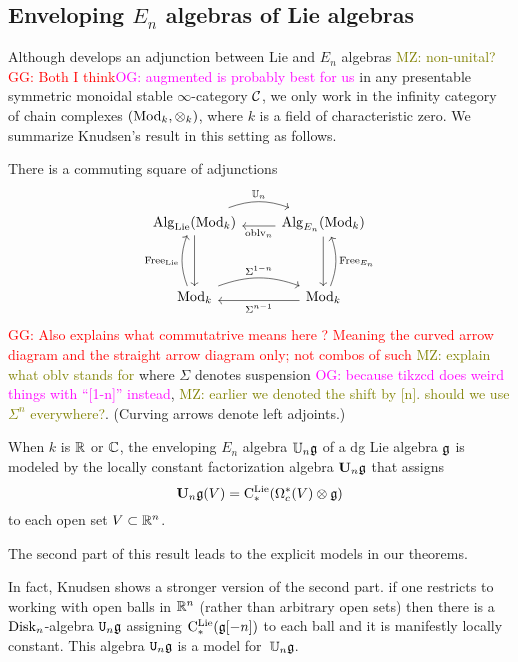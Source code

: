 \documentclass[11pt]{amsart}
\numberwithin{equation}{section}
\def\owen{\textcolor{magenta}{OG: }\textcolor{magenta}}
\def\mahmoud{\textcolor{olive}{MZ: }\textcolor{olive}}
\def\greg{\textcolor{red}{GG: }\textcolor{red}}
\begin{document}
\subsection{Enveloping $E_n$ algebras of Lie algebras}
\label{sec: enveloping}

Although \cite{Knudsen} develops an adjunction between Lie and $E_n$ algebras \mahmoud{non-unital?}\greg{Both I think}\owen{augmented is probably best for us}
in any presentable symmetric monoidal stable $\infty$-category $\mathcal C$,
we only work in the infinity category of chain complexes $({\rm Mod}_k, \otimes_k)$, where $k$ is a field of characteristic zero.
We summarize Knudsen's result in this setting as follows.

\begin{thm}\label{T:UnofLie}
There is a commuting square of adjunctions
\[
\begin{tikzcd}
\Alg_\Lie(\Mod_k) \arrow[r, bend left=20, shift left=.5ex,"\UU_n"] \arrow[dd] & \Alg_{E_n}(\Mod_k) \arrow[l, shift left=.5ex, "\oblv_n"] \arrow[dd]\\
&\\
\Mod_k \arrow[r, bend left=20, shift left=.5ex, "\Sigma^{1-n}"] \arrow[uu, bend left=20, shift left=.5ex, "\Free_\Lie"] & \Mod_k \arrow[l, shift left=.5ex,"\Sigma^{n-1}"] \arrow[uu, bend right=20, shift right=.5ex, "\Free_{E_n}"']
\end{tikzcd}
\]
\greg{Also explains what commutatrive means here ? Meaning the curved arrow diagram and the straight arrow diagram only; not combos of such}
\mahmoud{explain what oblv stands for}
where $\Sigma$ denotes suspension \owen{because tikzcd does weird things with ``[1-n]'' instead}, \mahmoud{earlier we denoted the shift by [n]. should we use $\Sigma^n$ everywhere?}.
(Curving arrows denote left adjoints.)

When $k$ is $\mathbb R$ or $\mathbb C$, 
the enveloping $E_n$ algebra $\mathbb U_n \mathfrak g$ of a dg Lie algebra $\mathfrak g$ is modeled by the locally constant factorization algebra $\mathbf U_n \mathfrak g$ that assigns
\[
\mathbf U_n \mathfrak g(V) = {\rm C}^{\rm Lie}_*(\Omega^*_c(V) \otimes \mathfrak g)
\]
to each open set $V \subset \mathbb R^n$.
\end{thm}

The second part of this result leads to the explicit models in our theorems.

In fact, Knudsen shows a stronger version of the second part.
if one restricts to working with open balls in $\mathbb R^n$ (rather than arbitrary open sets)
then there is a ${\rm Disk}_n$-algebra ${\tt U}_n \mathfrak g$ assigning ${\rm C}^{\rm Lie}_*(\mathfrak g[-n])$ to each ball and it is manifestly locally constant.
This algebra ${\tt U}_n \mathfrak g$ is a model for~$\mathbb U_n \mathfrak g$.
\end{document}
